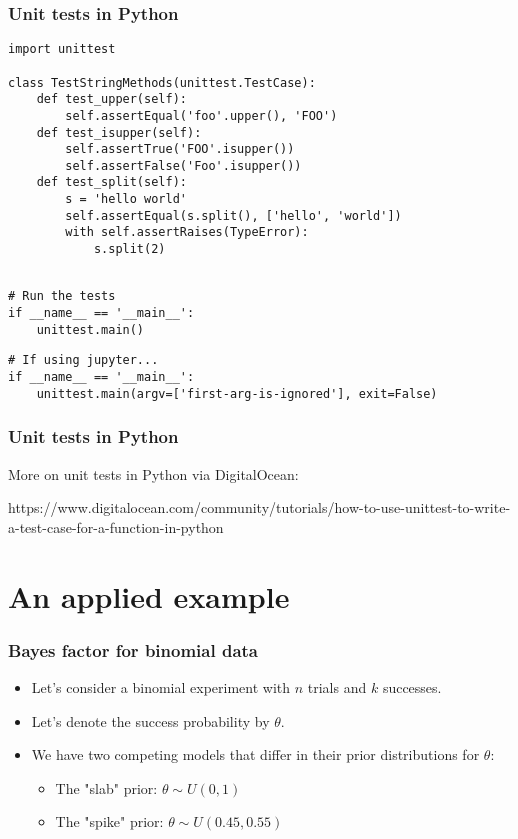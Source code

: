 \documentclass{beamer}
\begin{document}
\begin{frame}[fragile]
  \frametitle{Unit tests in Python}
  \begin{lstlisting}[style=Python]
import unittest

class TestStringMethods(unittest.TestCase):  
    def test_upper(self):
        self.assertEqual('foo'.upper(), 'FOO')
    def test_isupper(self):
        self.assertTrue('FOO'.isupper())
        self.assertFalse('Foo'.isupper())
    def test_split(self):
        s = 'hello world'
        self.assertEqual(s.split(), ['hello', 'world'])
        with self.assertRaises(TypeError):
            s.split(2)
            
  \end{lstlisting}\pause
  
  \begin{lstlisting}[style=Python]
# Run the tests
if __name__ == '__main__':
    unittest.main()
  \end{lstlisting}

\vspace{-1ex}

  \begin{lstlisting}[style=Python]
# If using jupyter...
if __name__ == '__main__':
    unittest.main(argv=['first-arg-is-ignored'], exit=False)
  \end{lstlisting}

\end{frame}

\begin{frame}[fragile]
  \frametitle{Unit tests in Python}
  More on unit tests in Python via DigitalOcean: 
  
  https://www.digitalocean.com/community/tutorials/how-to-use-unittest-to-write-a-test-case-for-a-function-in-python
\end{frame}



\section{An applied example}

\begin{frame}
\frametitle{Bayes factor for binomial data}

\begin{itemize}
\item Let's consider a binomial experiment with $n$ trials and $k$ successes.
\item Let's denote the success probability by $\theta$.
\item We have two competing models that differ in their prior distributions for $\theta$:
\begin{itemize}
\item The "slab" prior: $\theta \sim U(0, 1)$
\item The "spike" prior: $\theta \sim U(0.45, 0.55)$
\end{itemize}
\end{itemize}

\end{frame}
\end{document}
